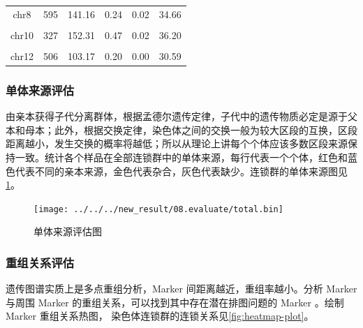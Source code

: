 \documentclass[
  a4paper,
  titlepage]{article}
\begin{document}
\begin{longtable}[t]{cccccc}
chr8 & 595 & 141.16 & 0.24 & 0.02 & 34.66\\
 
\cellcolor{gray!6}{chr9} & \cellcolor{gray!6}{696} & \cellcolor{gray!6}{104.90} & \cellcolor{gray!6}{0.15} & \cellcolor{gray!6}{0.01} & \cellcolor{gray!6}{20.08}\\
 
chr10 & 327 & 152.31 & 0.47 & 0.02 & 36.20\\
 
\cellcolor{gray!6}{chr11} & \cellcolor{gray!6}{302} & \cellcolor{gray!6}{67.31} & \cellcolor{gray!6}{0.22} & \cellcolor{gray!6}{0.01} & \cellcolor{gray!6}{27.86}\\
 
chr12 & 506 & 103.17 & 0.20 & 0.00 & 30.59\\*
\end{longtable}

\hypertarget{ux5355ux4f53ux6765ux6e90ux8bc4ux4f30}{%
\subsubsection{单体来源评估}\label{ux5355ux4f53ux6765ux6e90ux8bc4ux4f30}}

由亲本获得子代分离群体，根据孟德尔遗传定律，子代中的遗传物质必定是源于父本和母本；此外，根据交换定律，染色体之间的交换一般为较大区段的互换，区段距离越小，发生交换的概率将越低；所以从理论上讲每个个体应该多数区段来源保持一致。统计各个样品在全部连锁群中的单体来源，每行代表一个个体，红色和蓝色代表不同的亲本来源，金色代表杂合，灰色代表缺少。连锁群的单体来源图见\ref{fig:binmap-plot}。

\begin{figure}[H]

{\centering \texttt{[image: ../../../new\_result/08.evaluate/total.bin]} 

}

\caption{单体来源评估图}\label{fig:binmap-plot}
\end{figure}

\hypertarget{ux91cdux7ec4ux5173ux7cfbux8bc4ux4f30}{%
\subsubsection{重组关系评估}\label{ux91cdux7ec4ux5173ux7cfbux8bc4ux4f30}}

遗传图谱实质上是多点重组分析，Marker 间距离越近，重组率越小。分析 Marker 与周围 Marker 的重组关系，可以找到其中存在潜在排图问题的 Marker 。绘制 Marker 重组关系热图， 染色体连锁群的连锁关系见\ref{fig:heatmap-plot}。
\end{document}
